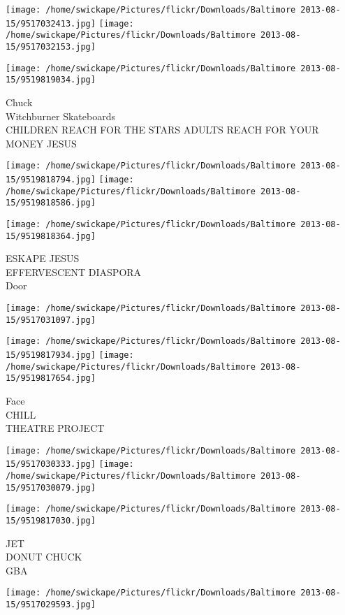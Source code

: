 \documentclass[10pt,letterpaper]{article}
\begin{document}
\texttt{[image: /home/swickape/Pictures/flickr/Downloads/Baltimore 2013-08-15/9517032413.jpg]}
\texttt{[image: /home/swickape/Pictures/flickr/Downloads/Baltimore 2013-08-15/9517032153.jpg]}

\vspace{0.25in}
\texttt{[image: /home/swickape/Pictures/flickr/Downloads/Baltimore 2013-08-15/9519819034.jpg]}

Chuck\\
Witchburner Skateboards\\
CHILDREN REACH FOR THE STARS ADULTS REACH FOR YOUR MONEY JESUS
\pagebreak

\texttt{[image: /home/swickape/Pictures/flickr/Downloads/Baltimore 2013-08-15/9519818794.jpg]}
\texttt{[image: /home/swickape/Pictures/flickr/Downloads/Baltimore 2013-08-15/9519818586.jpg]}

\texttt{[image: /home/swickape/Pictures/flickr/Downloads/Baltimore 2013-08-15/9519818364.jpg]}

ESKAPE JESUS\\
EFFERVESCENT DIASPORA\\
Door
\pagebreak

\texttt{[image: /home/swickape/Pictures/flickr/Downloads/Baltimore 2013-08-15/9517031097.jpg]}

\vspace{0.25in}
\texttt{[image: /home/swickape/Pictures/flickr/Downloads/Baltimore 2013-08-15/9519817934.jpg]}
\texttt{[image: /home/swickape/Pictures/flickr/Downloads/Baltimore 2013-08-15/9519817654.jpg]}

Face\\
CHILL\\
THEATRE PROJECT
\pagebreak

\texttt{[image: /home/swickape/Pictures/flickr/Downloads/Baltimore 2013-08-15/9517030333.jpg]}
\texttt{[image: /home/swickape/Pictures/flickr/Downloads/Baltimore 2013-08-15/9517030079.jpg]}

\texttt{[image: /home/swickape/Pictures/flickr/Downloads/Baltimore 2013-08-15/9519817030.jpg]}

JET\\
DONUT CHUCK\\
GBA
\pagebreak

\texttt{[image: /home/swickape/Pictures/flickr/Downloads/Baltimore 2013-08-15/9517029593.jpg]}
\end{document}
